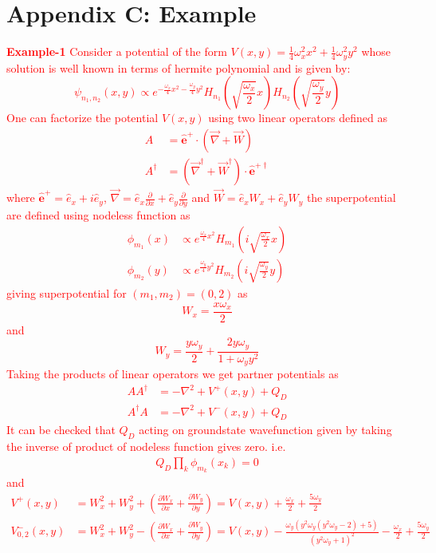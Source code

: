 \documentclass[12pt]{article}
\numberwithin{equation}{section} %
\begin{document}
\section*{Appendix C: Example}
\textcolor{red}{
{\bf Example-1}
Consider a potential of the form $V(x,y)=\frac{1}{4}\omega_x^2x^2+\frac{1}{4}\omega_y^2y^2$ whose solution is well known in terms of hermite polynomial and is given by:
\begin{equation}
  \psi_{n_1,n_2}(x,y)\propto e^{-\frac{\omega_x}{4}x^2-\frac{\omega_y}{4}y^2}H_{n_1}\left(\sqrt{\frac{\omega_x}{2}}x\right)H_{n_2}\left(\sqrt{\frac{\omega_y}{2}}y\right)
\end{equation}
One can factorize the potential $V(x,y)$ using two linear operators defined as
\begin{align*}
  A&=\mathbf{\hat{e}}^+\cdot(\vec{\nabla}+\vec{W})\\
  A^{\dagger}&=(\vec{\nabla}^\dagger+\vec{W}^\dagger)\cdot\mathbf{\hat{e}}^{+\dagger}
\end{align*}
where 
$\mathbf{\hat{e}}^+=\hat{e}_x+i\hat{e}_y$, $\vec{\nabla}=\hat{e}_x\frac{\partial}{\partial x}+\hat{e}_y\frac{\partial}{\partial y}$ and $\vec{W}=\hat{e}_xW_x+\hat{e}_yW_y$
the superpotential are defined using nodeless function as
\begin{align*}
  \phi_{m_1}(x)&\propto e^{\frac{\omega_x}{4}x^2}H_{m_1}\left(i\sqrt{\frac{\omega_x}{2}}x\right)\\
  \phi_{m_2}(y)&\propto e^{\frac{\omega_y}{4}y^2}H_{m_2}\left(i\sqrt{\frac{\omega_y}{2}}y\right)
\end{align*}
giving superpotential for $(m_1,m_2)=(0,2)$ as 
\[W_x=\frac{x\omega_x}{2}\] and \[W_y=\frac{y\omega_y}{2}+\frac{2 y\omega_y}{1+ \omega_y y^2}\]
Taking the products of linear operators we get partner potentials as
\begin{align*}
  A A^\dagger&=-\nabla^2+V^+(x,y)+Q_D\\
  A^\dagger A&=-\nabla^2+V^-(x,y)+Q_D
\end{align*}
It can be checked that $Q_D$ acting on groundstate wavefunction given by taking the inverse of product of nodeless function gives zero. i.e.
\begin{align*}
  Q_D\prod_{k}\phi_{m_k}(x_k)=0
\end{align*}
and 
\begin{align*}
  V^+(x,y)&=W_x^2+W_y^2+\left(\frac{\partial W_x}{\partial x}+\frac{\partial W_y}{\partial y}\right)=V(x,y)+\frac{\omega_x}{2}+\frac{5 \omega_y}{2}\\
  V^-_{0,2}(x,y)&=W_x^2+W_y^2-\left(\frac{\partial W_x}{\partial x}+\frac{\partial W_y}{\partial y}\right)=V(x,y)-\frac{\omega_y \left(y^2 \omega_y \left(y^2 \omega_y -2\right)+5\right)}{\left(y^2 \omega_y +1\right)^2}-\frac{\omega_x}{2}+\frac{5 \omega_y}{2}

\end{align*}}
\end{document}

